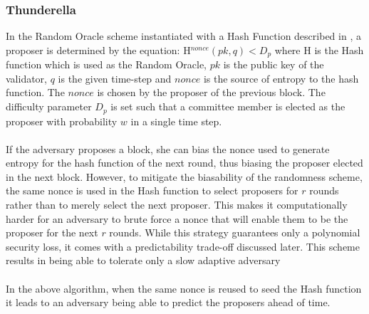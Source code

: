 \documentclass[10pt,journal,compsoc]{IEEEtran}
\begin{document}
\subsubsection{Thunderella}
In the Random Oracle scheme instantiated with a Hash Function described in \cite{SnowWhite}, a proposer is determined by the equation:
H$^{nonce}(pk, q) < D_p$ where H is the Hash function which is used as the Random Oracle, $pk$ is the public key of the validator, $q$ is the given time-step and $nonce$ is the source of entropy to the hash function. The $nonce$ is chosen by the proposer of the previous block. The difficulty parameter $D_p$ is set such that a committee member is elected as the proposer with probability $w$ in a single time step. 
\\\\
If the adversary proposes a block, she can bias the nonce used to generate entropy for the hash function of the next round, thus biasing the proposer elected in the next block. However, to mitigate the biasability of the randomness scheme, the same nonce is used in the Hash function to select proposers for $r$ rounds rather than to merely select the next proposer. This makes it computationally harder for an adversary to brute force a nonce that will enable them to be the proposer for the next $r$ rounds. While this strategy guarantees only a polynomial security loss, it comes with a predictability trade-off discussed later. This scheme results in being able to tolerate only a slow adaptive adversary
\\\\
In the above algorithm, when the same nonce is reused to seed the Hash function it leads to an adversary being able to predict the proposers ahead of time. 
\end{document}
